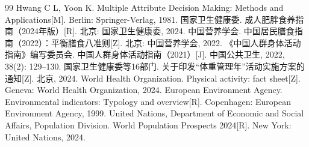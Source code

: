 \begin{thebibliography}{99}
 Hwang C L, Yoon K. Multiple Attribute Decision Making: Methods and Applications[M]. Berlin: Springer-Verlag, 1981.
 国家卫生健康委. 成人肥胖食养指南（2024年版）[R]. 北京: 国家卫生健康委, 2024.
 中国营养学会. 中国居民膳食指南（2022）：平衡膳食八准则[Z]. 北京: 中国营养学会, 2022.
 《中国人群身体活动指南》编写委员会. 中国人群身体活动指南（2021）[J]. 中国公共卫生, 2022, 38(2): 129--130.
 国家卫生健康委等16部门. 关于印发“体重管理年”活动实施方案的通知[Z]. 北京, 2024.
 World Health Organization. Physical activity: fact sheet[Z]. Geneva: World Health Organization, 2024.
 European Environment Agency. Environmental indicators: Typology and overview[R]. Copenhagen: European Environment Agency, 1999.
 United Nations, Department of Economic and Social Affairs, Population Division. World Population Prospects 2024[R]. New York: United Nations, 2024.
\end{thebibliography}

